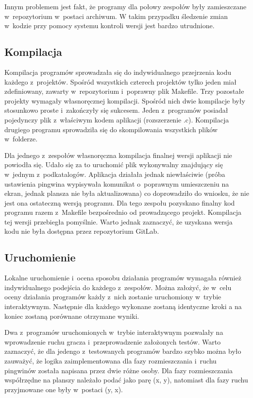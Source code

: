 Innym problemem jest fakt, że programy dla połowy zespołów były zamieszczane w~repozytorium w~postaci archiwum.
W takim przypadku śledzenie zmian w~kodzie przy pomocy systemu kontroli wersji jest bardzo utrudnione.

\subsection{Kompilacja}

Kompilacja programów sprowadzała się do indywidualnego przejrzenia kodu każdego z~projektów.
Spośród wszystkich czterech projektów tylko jeden miał zdefiniowany, zawarty w~repozytorium i~poprawny plik Makefile.
Trzy pozostałe projekty wymagały własnoręcznej kompilacji.
Spośród nich dwie kompilacje były stosunkowo proste i~zakończyły się sukcesem.
Jeden z~programów posiadał pojedynczy plik z~właściwym kodem aplikacji (rozszerzenie .c).
Kompilacja drugiego programu sprowadziła się do skompilowania wszystkich plików w~folderze.

Dla jednego z~zespołów własnoręczna kompilacja finalnej wersji aplikacji nie powiodła się.
Udało się za to uruchomić plik wykonywalny znajdujący się w~jednym z~podkatalogów.
Aplikacja działała jednak niewłaściwie (próba ustawienia pingwina wypisywała komunikat o~poprawnym umieszczeniu na ekran, jednak plansza nie była aktualizowana) co doprowadziło do wniosku, że nie jest ona ostateczną wersją programu.
Dla tego zespołu pozyskano finalny kod programu razem z~Makefile bezpośrednio od prowadzącego projekt.
Kompilacja tej wersji przebiegła pomyślnie.
Warto jednak zaznaczyć, że uzyskana wersja kodu nie była dostępna przez repozytorium GitLab.

\subsection{Uruchomienie}

Lokalne uruchomienie i~ocena sposobu działania programów wymagała również indywidualnego podejścia do każdego z~zespołów.
Można założyć, że w~celu oceny działania programów każdy z~nich zostanie uruchomiony w~trybie interaktywnym.
Następnie dla każdego wykonane zostaną identyczne kroki a na koniec zostaną porównane otrzymane wyniki.

Dwa z~programów uruchomionych w~trybie interaktywnym pozwalały na wprowadzenie ruchu gracza i~przeprowadzenie założonych testów.
Warto zaznaczyć, że dla jedengo z~testowanych programów bardzo szybko można było zauważyć, że logika zaimplementowana dla fazy rozmieszczania i~ruchu pingwinów została napisana przez dwie różne osoby.
Dla fazy rozmieszczania współrzędne na planszy należało podać jako parę (x, y), natomiast dla fazy ruchu przyjmowane one były w~postaci (y, x).

